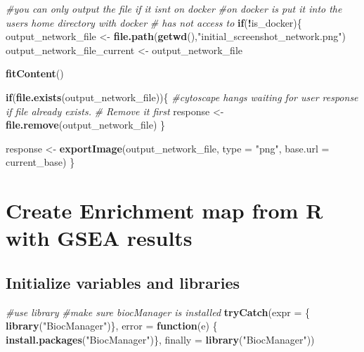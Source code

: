 \documentclass[
]{book}
\newenvironment{Shaded}{\begin{snugshade}}{\end{snugshade}}
\newcommand{\AttributeTok}[1]{\textcolor[rgb]{0.13,0.29,0.53}{#1}}
\newcommand{\CommentTok}[1]{\textcolor[rgb]{0.56,0.35,0.01}{\textit{#1}}}
\newcommand{\ControlFlowTok}[1]{\textcolor[rgb]{0.13,0.29,0.53}{\textbf{#1}}}
\newcommand{\FunctionTok}[1]{\textcolor[rgb]{0.13,0.29,0.53}{\textbf{#1}}}
\newcommand{\NormalTok}[1]{#1}
\newcommand{\OtherTok}[1]{\textcolor[rgb]{0.56,0.35,0.01}{#1}}
\newcommand{\SpecialCharTok}[1]{\textcolor[rgb]{0.81,0.36,0.00}{\textbf{#1}}}
\newcommand{\StringTok}[1]{\textcolor[rgb]{0.31,0.60,0.02}{#1}}
\begin{document}
\begin{Shaded}
\begin{Highlighting}[]
\CommentTok{\#you can only output the file if it isn\textquotesingle{}t on docker}
\CommentTok{\#on docker is put it into the user\textquotesingle{}s home directory with docker }
\CommentTok{\# has not access to}
\ControlFlowTok{if}\NormalTok{(}\SpecialCharTok{!}\NormalTok{is\_docker)\{}
\NormalTok{  output\_network\_file }\OtherTok{\textless{}{-}} \FunctionTok{file.path}\NormalTok{(}\FunctionTok{getwd}\NormalTok{(),}\StringTok{"initial\_screenshot\_network.png"}\NormalTok{)}
\NormalTok{  output\_network\_file\_current }\OtherTok{\textless{}{-}}\NormalTok{ output\_network\_file}

  \FunctionTok{fitContent}\NormalTok{()}

  \ControlFlowTok{if}\NormalTok{(}\FunctionTok{file.exists}\NormalTok{(output\_network\_file))\{}
    \CommentTok{\#cytoscape hangs waiting for user response if file already exists.}
    \CommentTok{\# Remove it first}
\NormalTok{    response }\OtherTok{\textless{}{-}} \FunctionTok{file.remove}\NormalTok{(output\_network\_file)}
\NormalTok{  \} }

\NormalTok{  response }\OtherTok{\textless{}{-}} \FunctionTok{exportImage}\NormalTok{(output\_network\_file, }\AttributeTok{type =} \StringTok{"png"}\NormalTok{,}
                          \AttributeTok{base.url =}\NormalTok{ current\_base)}
\NormalTok{\}}
\end{Highlighting}
\end{Shaded}

\chapter{Create Enrichment map from R with GSEA results}\label{create-enrichment-map-from-r-with-gsea-results-1}

\section{Initialize variables and libraries}\label{initialize-variables-and-libraries-1}

\begin{Shaded}
\begin{Highlighting}[]
\CommentTok{\#use library}
\CommentTok{\#make sure biocManager is installed}
\FunctionTok{tryCatch}\NormalTok{(}\AttributeTok{expr =}\NormalTok{ \{ }\FunctionTok{library}\NormalTok{(}\StringTok{"BiocManager"}\NormalTok{)\}, }
         \AttributeTok{error =} \ControlFlowTok{function}\NormalTok{(e) \{ }
           \FunctionTok{install.packages}\NormalTok{(}\StringTok{"BiocManager"}\NormalTok{)\}, }
         \AttributeTok{finally =} \FunctionTok{library}\NormalTok{(}\StringTok{"BiocManager"}\NormalTok{))}
\end{Highlighting}
\end{Shaded}
\end{document}
